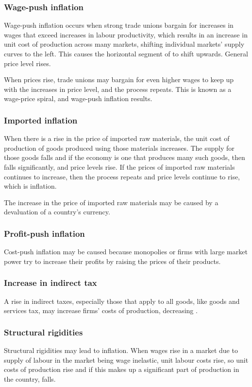 \documentclass[Economics.tex]{subfiles}
\begin{document}
\subsubsection{Wage-push inflation}
Wage-push inflation occurs when strong trade unions bargain for increases in wages that exceed increases in labour productivity, which results in an increase in unit cost of production across many markets, shifting individual markets' supply curves to the left. This causes the horizontal segment of \AS{} to shift upwards. General price level rises.

When prices rise, trade unions may bargain for even higher wages to keep up with the increases in price level, and the process repeats. This is known as a wage-price spiral, and wage-push inflation results.
\subsubsection{Imported inflation}
When there is a rise in the price of imported raw materials, the unit cost of production of goods produced using those materials increases. The supply for those goods falls and if the economy is one that produces many such goods, then \AS{} falls significantly, and price levels rise. If the prices of imported raw materials continues to increase, then the process repeats and price levels continue to rise, which is inflation.

The increase in the price of imported raw materials may be caused by a devaluation of a country's currency.
\subsubsection{Profit-push inflation}
Cost-push inflation may be caused because monopolies or firms with large market power try to increase their profits by raising the prices of their products.
\subsubsection{Increase in indirect tax}
A rise in indirect taxes, especially those that apply to all goods, like goods and services tax, may increase firms' costs of production, decreasing \AS{}.
\subsubsection{Structural rigidities}
Structural rigidities may lead to inflation. When wages rise in a market due to supply of labour in the market being wage inelastic, unit labour costs rise, so unit costs of production rise and if this makes up a significant part of production in the country, \AS{} falls.
\end{document}
